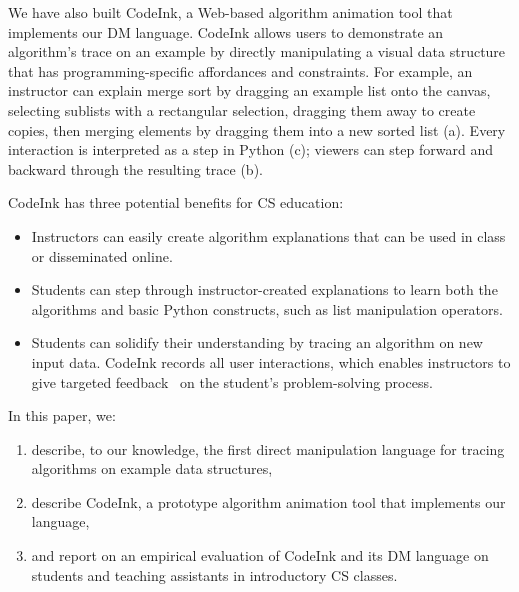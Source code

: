 We have also built CodeInk, a Web-based algorithm animation tool that implements
our DM language. CodeInk allows users to demonstrate an algorithm's trace on an
example by directly manipulating a visual data structure that has
programming-specific affordances and constraints. For example, an instructor can
explain merge sort by dragging an example list onto the canvas, selecting
sublists with a rectangular selection, dragging them away to create copies, then
merging elements by dragging them into a new sorted list
(a). Every interaction is interpreted as a step in Python
(c); viewers can step forward and backward through the
resulting trace (b).

CodeInk has three potential benefits for CS education:

\begin{itemize}\itemsep2pt

\item Instructors can easily create algorithm explanations that can be
used in class or disseminated online.

\item Students can step through instructor-created explanations to learn
both the algorithms and basic Python constructs, such as list
manipulation operators.

\item Students can solidify their understanding by tracing an algorithm on new
input data. CodeInk records all user interactions, which enables instructors to
give targeted feedback~\cite{Balzer1989} on the student's problem-solving
process.

\end{itemize}


In this paper, we:%

\begin{enumerate} %

\item describe, to our knowledge, the first direct manipulation language
for tracing algorithms on example data structures,

\item describe CodeInk, a prototype algorithm animation tool that
implements our language,

\item and report on an empirical evaluation of CodeInk and its DM
language on students and teaching assistants in introductory CS classes.

\end{enumerate}

